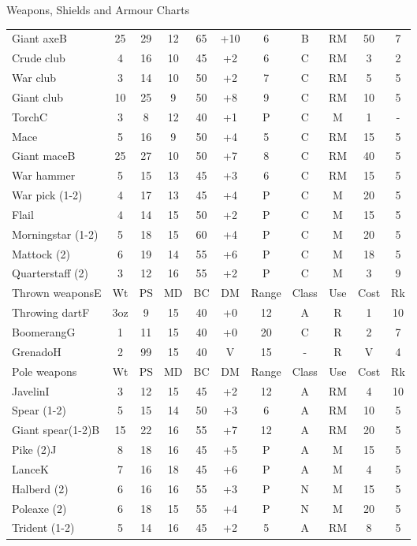 \begin{Table}{Weapons, Shields and Armour Charts}
\begin{tabularx}{\linewidth}{Xcccccccccc}
Giant axeB		& 25	& 29	& 12	& 65	& +10	& 6	& B	& RM	& 50	& 7	\\
Crude club		& 4	& 16	& 10	& 45	& +2	& 6	& C	& RM	& 3	& 2	\\
War club		& 3	& 14	& 10	& 50	& +2	& 7	& C	& RM	& 5	& 5	\\
Giant club		& 10	& 25	& 9	& 50	& +8	& 9	& C	& RM	& 10	& 5	\\
TorchC			& 3	& 8	& 12	& 40	& +1	& P	& C	& M	& 1	& -	\\
Mace			& 5	& 16	& 9	& 50	& +4	& 5	& C	& RM	& 15	& 5	\\
Giant maceB		& 25	& 27	& 10	& 50	& +7	& 8	& C	& RM	& 40	& 5	\\
War hammer		& 5	& 15	& 13	& 45	& +3	& 6	& C	& RM	& 15	& 5	\\
War pick (1-2)		& 4	& 17	& 13	& 45	& +4	& P	& C	& M	& 20	& 5	\\
Flail			& 4	& 14	& 15	& 50	& +2	& P	& C	& M	& 15	& 5	\\
Morningstar (1-2)	& 5	& 18	& 15	& 60	& +4	& P	& C	& M	& 20	& 5	\\
Mattock (2)		& 6	& 19	& 14	& 55	& +6	& P	& C	& M	& 18	& 5	\\
Quarterstaff (2)	& 3	& 12	& 16	& 55	& +2	& P	& C	& M	& 3	& 9	\\ 
Thrown weaponsE		& Wt	& PS	& MD	& BC	& DM	& Range	& Class	& Use	& Cost	& Rk	\\
Throwing dartF		& 3oz	& 9	& 15	& 40	& +0	& 12	& A	& R	& 1	& 10	\\
BoomerangG		& 1	& 11	& 15	& 40	& +0	& 20	& C	& R	& 2	& 7	\\
GrenadoH		& 2	& 99	& 15	& 40	& V	& 15	& -	& R	& V	& 4	\\
Pole weapons		& Wt	& PS	& MD	& BC	& DM	& Range	& Class	& Use	& Cost	& Rk	\\
JavelinI		& 3	& 12	& 15	& 45	& +2	& 12	& A	& RM	& 4	& 10	\\
Spear (1-2)		& 5	& 15	& 14	& 50	& +3	& 6	& A	& RM	& 10	& 5	\\
Giant spear(1-2)B	& 15	& 22	& 16	& 55	& +7	& 12	& A	& RM	& 20	& 5	\\
Pike (2)J		& 8	& 18	& 16	& 45	& +5	& P	& A	& M	& 15	& 5	\\
LanceK			& 7	& 16	& 18	& 45	& +6	& P	& A	& M	& 4	& 5	\\
Halberd (2)		& 6	& 16	& 16	& 55	& +3	& P	& N	& M	& 15	& 5	\\
Poleaxe (2)		& 6	& 18	& 15	& 55	& +4	& P	& N	& M	& 20	& 5	\\
Trident (1-2)		& 5	& 14	& 16	& 45	& +2	& 5	& A	& RM	& 8	& 5	\\

\end{tabularx}
\end{Table}
